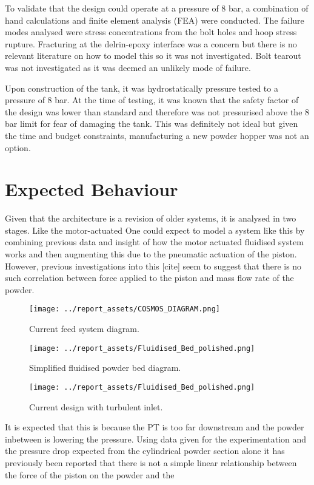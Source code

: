 To validate that the design could operate at a pressure of 8 bar, a combination of hand calculations and finite element analysis (FEA) were conducted. The failure modes analysed were stress concentrations from the bolt holes and hoop stress rupture. Fracturing at the delrin-epoxy interface was a concern but there is no relevant literature on how to model this so it was not investigated. Bolt tearout was not investigated as it was deemed an unlikely mode of failure.

Upon construction of the tank, it was hydrostatically pressure tested to a pressure of 8 bar. At the time of testing, it was known that the safety factor of the design was lower than standard and therefore was not pressurised above the 8 bar limit for fear of damaging the tank. This was definitely not ideal but given the time and budget constraints, manufacturing a new powder hopper was not an option.
\newpage
\section{Expected Behaviour}
Given that the architecture is a revision of older systems, it is analysed in two stages. Like the motor-actuated 
One could expect to model a system like this by combining previous data and insight of how the motor actuated fluidised system works and then augmenting this due to the pneumatic actuation of the piston. However, previous investigations into this [cite] seem to suggest that there is no such correlation between force applied to the piston and mass flow rate of the powder. 

\begin{figure}[htbp]
    \centering

    \begin{minipage}{0.3\textwidth}
        \centering
        \texttt{[image: ../report\_assets/COSMOS\_DIAGRAM.png]}
        \caption{Current feed system diagram.}\label{fig:idkyet1}
    \end{minipage}
    \hfill
    \begin{minipage}{0.3\textwidth}
        \centering
        \texttt{[image: ../report\_assets/Fluidised\_Bed\_polished.png]}
        \caption{Simplified fluidised powder bed diagram.}\label{fig:idkyet2}
    \end{minipage}
    \hfill
    \begin{minipage}{0.3\textwidth}
        \centering
        \texttt{[image: ../report\_assets/Fluidised\_Bed\_polished.png]}
        \caption{Current design with turbulent inlet.}\label{fig:idkyet3}
    \end{minipage}

\end{figure}
It is expected that this is because the PT is too far downstream and the powder inbetween is lowering the pressure. Using data given for the experimentation and the pressure drop expected from the cylindrical powder section alone
it has previously been reported that there is not a simple linear relationship between the force of the piston on the powder and the 


